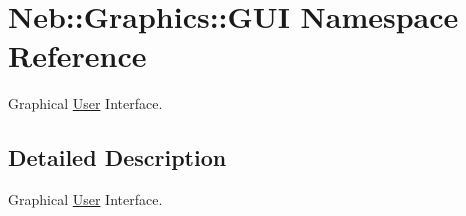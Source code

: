 \hypertarget{namespaceNeb_1_1Graphics_1_1GUI}{\section{\-Neb\-:\-:\-Graphics\-:\-:\-G\-U\-I \-Namespace \-Reference}
\label{namespaceNeb_1_1Graphics_1_1GUI}
}


\-Graphical \hyperlink{classNeb_1_1User}{\-User} \-Interface.  




\subsection{\-Detailed \-Description}
\-Graphical \hyperlink{classNeb_1_1User}{\-User} \-Interface. 